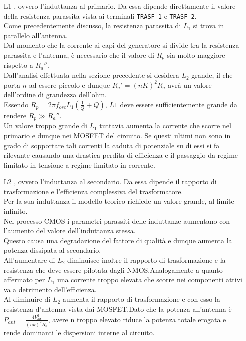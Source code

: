 \documentclass[a4paper, 12pt]{memoir}
\begin{document}
\begin{enumerate}
\item[L1], ovvero l'induttanza al primario. Da essa dipende direttamente il
	valore della resistenza parassita vista ai terminali \texttt{TRASF\_1} e
	\texttt{TRASF\_2}.\\
	Come precedentemente discusso, la resistenza parassita di $L_1$ si trova
	in parallelo all'antenna.\\
	Dal momento che la corrente ai capi del generatore si divide tra la
	resistenza parassita e l'antenna, è necessario che il valore di $R_p$ sia
	molto maggiore rispetto a $R_a''$.\\
	Dall'analisi effettuata nella sezione precedente si desidera $L_2$ 
	grande, il che porta $n$ ad essere piccolo e dunque $R_a' = {(nK)}^2R_a$
	avrà un valore dell'ordine di grandezza dell'ohm.\\
	Essendo $R_p = 2\pi f_{osc} L_1 \left(\frac{1}{Q} + Q \right)$, $L1$ deve
	essere sufficientemente grande da rendere $R_p \gg R_a''$.\\
	Un valore troppo grande di $L_1$ tuttavia aumenta la corrente che scorre
	nel primario e dunque nei MOSFET del circuito. Se questi ultimi non sono
	in grado di sopportare tali correnti la caduta di potenziale su di essi
	si fa rilevante causando una drastica perdita di efficienza e il
	passaggio da regime limitato in tensione a regime limitato in corrente.

\item[L2], ovvero l'induttanza al secondario. Da essa dipende il rapporto di
	trasformazione e l'efficienza complessiva del trasformatore.\\
	Per la sua induttanza il modello teorico richiede un valore grande, al
	limite infinito.\\
	Nel processo CMOS i parametri parassiti delle induttanze aumentano con
	l'aumento del valore dell'induttanza stessa\cite{RazaviRF}.\\
	Questo causa una degradazione del fattore di qualità e dunque aumenta la
	potenza dissipata al secondario.\\
	All'aumentare di $L_2$ diminuisce inoltre il rapporto di trasformazione e
      la resistenza che deve essere pilotata dagli NMOS.\@ Analogamente a
      quanto affermato per $L_1$ una corrente troppo elevata che scorre nei
      componenti attivi va a detrimento dell'efficienza.\\
	Al diminuire di $L_2$ aumenta il rapporto di trasformazione e con esso la
	resistenza d'antenna vista dai MOSFET.\@ Dato che la potenza all'antenna è
	$P_{ant}= \frac{4V_{dd}^2}{(nk)^2R_a}$, avere n troppo elevato riduce la
	potenza totale erogata e rende dominanti le dispersioni interne al
	circuito.


\end{enumerate}
\end{document}
